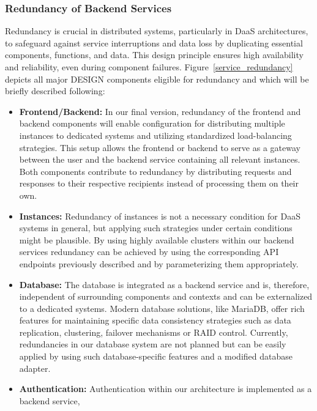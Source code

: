\documentclass[runningheads]{llncs}
\begin{document}
\subsubsection{Redundancy of Backend Services}

Redundancy is crucial in distributed systems,
particularly in DaaS architectures,
to safeguard against service interruptions and data loss
by duplicating essential components, functions, and data.
This design principle ensures high availability and reliability,
even during component failures.
Figure~\ref{service_redundancy} depicts all major DESIGN components eligible for redundancy
and which will be briefly described following:
\begin{itemize}
	\item \textbf{Frontend/Backend:}
	      In our final version,
	      redundancy of the frontend and backend components
	      will enable configuration for distributing multiple instances
	      to dedicated systems and utilizing standardized load-balancing strategies.
	      This setup allows the frontend or backend
	      to serve as a gateway between the user and the backend service
	      containing all relevant instances.
	      Both components contribute to redundancy
	      by distributing requests and responses to their respective recipients
	      instead of processing them on their own.
	\item \textbf{Instances:} Redundancy of instances
	      is not a necessary condition for DaaS systems in general,
	      but applying such strategies under certain conditions might be plausible.
	      By using highly available clusters within our backend services
	      redundancy can be achieved by using the corresponding API endpoints
	      previously described and by parameterizing them appropriately.
	\item \textbf{Database:}
	      The database is integrated as a backend service
	      and is, therefore, independent of surrounding components and contexts
	      and can be externalized to a dedicated systems.
	      Modern database solutions, like MariaDB,
	      offer rich features for maintaining specific data consistency strategies
	      such as data replication, clustering, failover mechanisms or RAID control.
	      Currently, redundancies in our database system are not planned
	      but can be easily applied by using such database-specific features
	      and a modified database adapter.
	\item \textbf{Authentication: }
	      Authentication within our architecture is implemented as a backend service,

\end{itemize}
\end{document}
